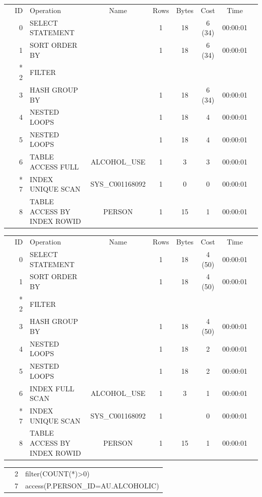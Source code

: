 \documentclass[11pt, a4paper]{article}
\begin{document}
\begin{table}[h]
	\begin{tabular}{r r l c c c c c}
	 & ID & Operation & Name & Rows & Bytes &  Cost  & Time & \hline \\
	 & 0 & SELECT STATEMENT 	& & 1 & 18 & 6 (34) & 00:00:01\\
	 & 1 & SORT ORDER BY     	& & 1 & 18 & 6 (34) & 00:00:01\\
	 & * 2 & FILTER 				& &  &  &  & \\
	 & 3 & HASH GROUP BY 		& & 1 & 18 & 6 (34) & 00:00:01\\
	 & 4 & NESTED LOOPS    		& & 1 & 18 & 4  & 00:00:01\\
	 & 5 & NESTED LOOPS    		& & 1 & 18 & 4  & 00:00:01\\
	 & 6 & TABLE ACCESS FULL   	& ALCOHOL\_USE & 1 & 3 & 3  & 00:00:01\\
	 & * 7 & INDEX UNIQUE SCAN  	& SYS\_C001168092 & 1 & 0 & 0  & 00:00:01\\	
	 & 8 & TABLE ACCESS BY INDEX ROWID	& PERSON & 1 & 15 & 1  & 00:00:01\\ 
	\end{tabular}
	
	\vspace{2em}
	
	\begin{tabular}{r r l c c c c c}
	 & ID & Operation & Name & Rows & Bytes &  Cost  & Time & \hline \\
	 & 0 & SELECT STATEMENT 	& & 1 & 18 & 4 (50) & 00:00:01\\
	 & 1 & SORT ORDER BY     	& & 1 & 18 & 4 (50) & 00:00:01\\
	 & * 2 & FILTER 				& &  &  &  & \\
	 & 3 & HASH GROUP BY 		& & 1 & 18 & 4 (50) & 00:00:01\\
	 & 4 & NESTED LOOPS    		& & 1 & 18 & 2  & 00:00:01\\
	 & 5 & NESTED LOOPS    		& & 1 & 18 & 2  & 00:00:01\\
	 & 6 & INDEX FULL SCAN     	& ALCOHOL\_USE & 1 & 3 & 1  & 00:00:01\\
	 & * 7 & INDEX UNIQUE SCAN  	& SYS\_C001168092 & 1 &  & 0    & 00:00:01\\	
	 & 8 & TABLE ACCESS BY INDEX ROWID	& PERSON & 1 & 15 & 1    & 00:00:01\\ 
	\end{tabular}
	
	\vspace{2em}
	
	\begin{tabular}{l l l}
	& 2 & filter(COUNT(*)>0) \\
	& 7 & access(P.PERSON\_ID=AU.ALCOHOLIC)\\
	\end{tabular}
\end{table}
\end{document}
